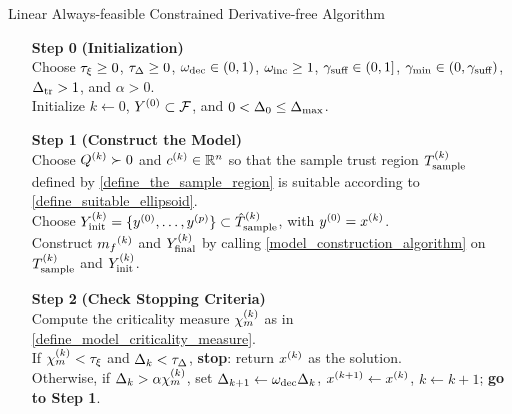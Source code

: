 \documentclass{article}
\newcommand{\real}{\mathbb R}
\begin{document}
{
\begin{fullwidth}[leftmargin=0in, rightmargin=0in, width=\linewidth-0.5in]
\begin{flushleft}

\begin{algorithm}[H]
    \caption{Linear Always-feasible Constrained Derivative-free Algorithm}
    \label{linearly_constrained_dfo_simple}
    \begin{itemize}
        \item[\textbf{Step 0}] \textbf{(Initialization)} \\
            Choose
            $\tau_{\xi}\ge 0$,
            $\tau_{\Delta} \ge 0$, 
            $\omega_{\text{dec}} \in (0,1)$, 
            $\omega_{\text{inc}} \ge 1$,  
            $ \gamma_{\textrm{suff}} \in (0,1]$, 
            $\gamma_{\textrm{min}} \in (0,\gamma_{\textrm{suff}})$,
            $\Delta_{\textrm{tr}} > 1$,
			and $\alpha > 0$. \\
            Initialize
            $k\gets 0$,
            $Y^{(0)} \subset {\mathcal F}$,
            and $0 < \Delta_0 \le {\Delta_{\textrm{max}}}$.
            
        \item[\textbf{Step 1}] \textbf{(Construct the Model)} \\
        Choose ${Q^{(k)}}\succ 0$ and $\ck\in \real^n$ so that the sample trust region ${T_{\text{sample}}^{(k)}}$ defined by \cref{define_the_sample_region} is suitable according to \cref{define_suitable_ellipsoid}.\\
       Choose $Y_{\textrm{init}}^{(k)} =\{y^{(0)}, \ldots, y^{(p)}\} \subset {\hat{T}_{\text{sample}}^{(k)}}$,  with $y^{(0)} = x^{(k)}$.  \\
           Construct ${{m}_f}^{(k)}$ and $Y_{\textrm{final}}^{(k)}$ by calling \cref{model_construction_algorithm} on ${T_{\text{sample}}^{(k)}}$ and $Y_{\textrm{init}}^{(k)}$.  
        
        \item[\textbf{Step 2}] \textbf{(Check Stopping Criteria)} \\
            Compute the criticality measure ${\chi_m^{(k)}}$ as in \cref{define_model_criticality_measure}. \\
            If $ {\chi_m^{(k)}} < \tau_{\xi} $ and $\Delta_k <\tau_{\Delta}$,  {\bf stop}: return $x^{(k)}$ as the solution.   \\
            Otherwise, if $\Delta_k > \alpha {\chi_m^{(k)}}$,   
            set 
                $\Delta_{k+1} \gets \omega_{\text{dec}}\Delta_k$, 
                ${{x}^{(k+1)}} \gets x^{(k)}$,
                $k \gets k+1$; {\bf go to Step 1}.
           

\end{itemize}
\end{algorithm}
\end{flushleft}
\end{fullwidth}}
\end{document}
